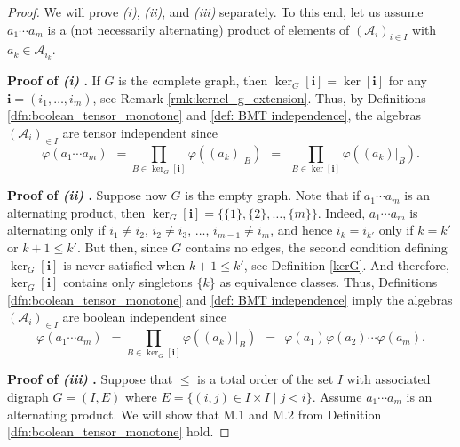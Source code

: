 \documentclass[a4paper,12pt]{extarticle}
\theoremstyle{definition}
\theoremstyle{remark}
\begin{document}
\begin{proof}
	We will prove \emph{(i)}, \emph{(ii)}, and \emph{(iii)} separately. 
	To this end, let us assume $a_1 \cdots a_m$ is a (not necessarily alternating) product of elements of  $(\mathcal{A}_i)_{i \in I}$ with $a_k \in \mathcal{A}_{i_k}$. 
	
	\noindent \textbf{Proof of \emph{(i)} .} 
	If $G$ is the complete graph, then $\ker_G[\bm{i}]=\ker[\bm{i}]$ for any $\bm{i} = (i_1, \ldots,i_m)$, see Remark \ref{rmk:kernel_g_extension}. 
	Thus, by Definitions \ref{dfn:boolean_tensor_monotone} and \ref{def: BMT independence}, the algebras $(\mathcal{A}_i)_{ \in I}$ are tensor independent since  
	\[ 
	\varphi(a_1\cdots a_m)
	\ \  = 
	\prod_{B \in \ker_G[\bm{i}]} \varphi((a_k)|_B)		
	\ \  = \ \
	 \prod_{B \in \ker[\bm{i}]} \varphi((a_k)|_B) . 
	\] 
	
	
	\noindent \textbf{Proof of \emph{(ii)} .}
	Suppose now $G$ is the empty graph. 
	Note that if $a_1 \cdots a_m$ is an alternating product, then $\ker_G[\bm{i}]=\{\{1\},\{2\},\dots,\{m\}\}$. 
	Indeed, $a_1 \cdots a_m$ is alternating only if $i_1 \neq i_2$, $i_2 \neq i_3$, $\ldots$, $i_{m-1} \neq i_m$, and hence $i_k = i_{k'}$ only if $k=k'$ or $k+1 \leq k'$. 
	But then, since $G$ contains no edges, the second condition defining $\ker_G[\bm{i}]$ is never satisfied when $k+1 \leq k'$, see Definition \ref{kerG}. 
	And therefore, $\ker_G[\bm{i}]$ contains only singletons $\{k\}$ as equivalence classes. 
	Thus, Definitions \ref{dfn:boolean_tensor_monotone} and \ref{def: BMT independence} imply the algebras $(\mathcal{A}_i)_{ \in I}$ are boolean independent since  
	\[ 
	\varphi(a_1\cdots a_m)
	\ \  = 
	\prod_{B \in \ker_G[\bm{i}]} \varphi((a_k)|_B)		
	\ \  = \ \
	\varphi(a_1)\varphi(a_2)\cdots \varphi(a_m). 
	\] 
	
	\noindent \textbf{Proof of \emph{(iii)} .} 
	Suppose that $\leq$ is a total order of the set $I$ with associated digraph $G=(I,E)$ where $E = \{ (i,j) \in I \times I \mid j < i \}$. 
	Assume $a_1 \cdots a_m$ is an alternating product. 
	We will show that M.1 and M.2 from Definition \ref{dfn:boolean_tensor_monotone} hold. 
	

\end{proof}
\end{document}
